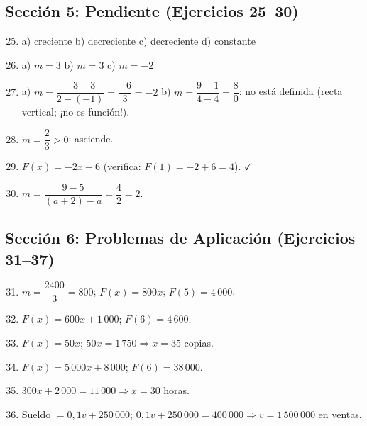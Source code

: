 \documentclass[12pt, letterpaper]{article}
\begin{document}
  \newpage

  \subsection*{Sección 5: Pendiente (Ejercicios 25--30)}

  \begin{enumerate}[leftmargin=*, label=\textbf{\arabic*.}]
    \setcounter{enumi}{24}
    \item a) creciente \quad b) decreciente \quad c) decreciente \quad d) constante

    \item a) $m = 3$ \quad b) $m = 3$ \quad c) $m = -2$

    \item a) $m = \dfrac{-3 - 3}{2 - (-1)} = \dfrac{-6}{3} = -2$ \quad b) $m = \dfrac{9 - 1}{4 - 4} = \dfrac{8}{0}$: no está definida (recta vertical; ¡no es función!).

    \item $m = \dfrac{2}{3} > 0$: asciende.

    \item $F(x) = -2x + 6$ (verifica: $F(1) = -2 + 6 = 4$). $\checkmark$

    \item $m = \dfrac{9 - 5}{(a + 2) - a} = \dfrac{4}{2} = 2$.
  \end{enumerate}

  \newpage

  \subsection*{Sección 6: Problemas de Aplicación (Ejercicios 31--37)}

  \begin{enumerate}[leftmargin=*, label=\textbf{\arabic*.}]
    \setcounter{enumi}{30}
    \item $m = \dfrac{2400}{3} = 800$; $F(x) = 800x$; $F(5) = 4\,000$.

    \item $F(x) = 600x + 1\,000$; $F(6) = 4\,600$.

    \item $F(x) = 50x$; $50x = 1\,750 \Rightarrow x = 35$ copias.

    \item $F(x) = 5\,000x + 8\,000$; $F(6) = 38\,000$.

    \item $300x + 2\,000 = 11\,000 \Rightarrow x = 30$ horas.

    \item Sueldo $= 0{,}1v + 250\,000$; $0{,}1v + 250\,000 = 400\,000 \Rightarrow v = 1\,500\,000$ en ventas.
  \end{enumerate}

\fi
\end{document}
